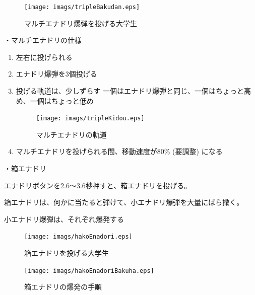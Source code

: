 \documentclass[12pt]{jsarticle}
\begin{document}
\begin{figure}[htbp]
  \begin{center}
    \texttt{[image: imags/tripleBakudan.eps]}
    \caption{マルチエナドリ爆弾を投げる大学生}
  \end{center}
\end{figure}

\newpage

・マルチエナドリの仕様
\begin{enumerate}
  \item 左右に投げられる
  \item エナドリ爆弾を3個投げる
  \item 投げる軌道は、少しずらす
  一個はエナドリ爆弾と同じ、一個はちょっと高め、一個はちょっと低め
  \begin{figure}[htbp]
    \begin{center}
      \texttt{[image: imags/tripleKidou.eps]}
      \caption{マルチエナドリの軌道}
    \end{center}
  \end{figure}
  \item マルチエナドリを投げられる間、移動速度が80\% (要調整) になる
\end{enumerate}

\newpage

・箱エナドリ

エナドリボタンを2.6〜3.6秒押すと、箱エナドリを投げる。

箱エナドリは、何かに当たると弾けて、小エナドリ爆弾を大量にばら撒く。

小エナドリ爆弾は、それぞれ爆発する

\begin{figure}[htbp]
  \begin{center}
    \texttt{[image: imags/hakoEnadori.eps]}
    \caption{箱エナドリを投げる大学生}
  \end{center}
\end{figure}

\begin{figure}[htbp]
  \begin{center}
    \texttt{[image: imags/hakoEnadoriBakuha.eps]}
    \caption{箱エナドリの爆発の手順}
  \end{center}
\end{figure}

\newpage
\end{document}
